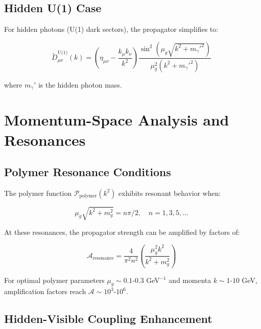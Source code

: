 \documentclass[12pt]{article}
\begin{document}
\subsection{Hidden U(1) Case}

For hidden photons (U(1) dark sectors), the propagator simplifies to:

\begin{equation}
\tilde{D}_{\mu\nu}^{\text{U(1)}}(k) = \left( \eta_{\mu\nu} - \frac{k_\mu k_\nu}{k^2} \right) \frac{\sin^2(\mu_g \sqrt{k^2 + m_\gamma'^2})}{\mu_g^2 (k^2 + m_\gamma'^2)}
\end{equation}

where $m_\gamma'$ is the hidden photon mass.

\section{Momentum-Space Analysis and Resonances}

\subsection{Polymer Resonance Conditions}

The polymer function $\mathcal{P}_{\text{polymer}}(k^2)$ exhibits resonant behavior when:

\begin{equation}
\mu_g \sqrt{k^2 + m_g^2} = n\pi/2, \quad n = 1,3,5,\ldots
\end{equation}

At these resonances, the propagator strength can be amplified by factors of:

\begin{equation}
\mathcal{A}_{\text{resonance}} = \frac{4}{\pi^2 n^2} \left( \frac{\mu_g^2 k^2}{k^2 + m_g^2} \right)
\end{equation}

For optimal polymer parameters $\mu_g \sim 0.1$-$0.3$ GeV$^{-1}$ and momenta $k \sim 1$-$10$ GeV, amplification factors reach $\mathcal{A} \sim 10^3$-$10^6$.

\subsection{Hidden-Visible Coupling Enhancement}
\end{document}

